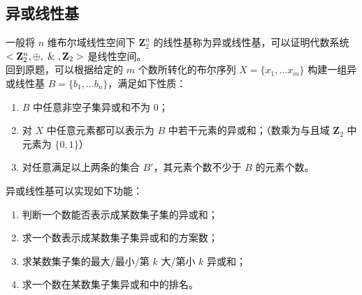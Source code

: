 \documentclass[12pt,a4paper]{article}
\begin{document}
\newpage
\subsection{异或线性基}
一般将 $n$ 维布尔域线性空间下 $\mathbf{Z}_2^n$ 的线性基称为异或线性基，可以证明代数系统 $<\mathbf{Z}_2^n,\oplus,\And,\mathbf{Z}_2>$ 是线性空间。\\
回到原题，可以根据给定的 $m$ 个数所转化的布尔序列 $X=\{x_1,...x_m\}$ 构建一组异或线性基 $B=\{b_1,...b_n\}$，满足如下性质：
\begin{enumerate}
	\item $B$ 中任意非空子集异或和不为 $0$；
	\item 对 $X$ 中任意元素都可以表示为 $B$ 中若干元素的异或和；（数乘为与且域 $\mathbf{Z}_2$ 中元素为 $\{0,1\}$）
	\item 对任意满足以上两条的集合 $B'$，其元素个数不少于 $B$ 的元素个数。
\end{enumerate}
异或线性基可以实现如下功能：
\begin{enumerate}
	\item 判断一个数能否表示成某数集子集的异或和；
	\item 求一个数表示成某数集子集异或和的方案数；
	\item 求某数集子集的最大/最小/第 $k$ 大/第小 $k$ 异或和；
	\item 求一个数在某数集子集异或和中的排名。
\end{enumerate}
\end{document}
